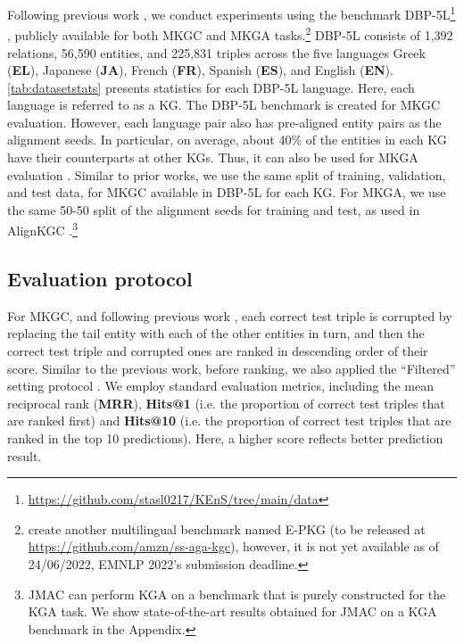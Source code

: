 \documentclass[11pt]{article}
\begin{document}
Following previous work \cite{singh2021multilingual,huang2022multilingual}, we conduct experiments using the benchmark DBP-5L\footnote{\url{https://github.com/stasl0217/KEnS/tree/main/data}} \cite{chen2020multilingual}, publicly available for both MKGC and MKGA tasks.\footnote{ create another multilingual benchmark named E-PKG (to be released at \url{https://github.com/amzn/ss-aga-kgc}), however, it is not yet available as of 24/06/2022, EMNLP 2022's submission deadline.}  DBP-5L consists of 1,392 relations, 56,590 entities, and 225,831 triples across the five languages Greek (\textbf{EL}), Japanese (\textbf{JA}), French (\textbf{FR}), Spanish (\textbf{ES}), and English (\textbf{EN}). \autoref{tab:datasetstats} presents statistics for each DBP-5L language.  Here, each language is referred to as a KG. The DBP-5L benchmark is created for MKGC evaluation. However, each language pair also has pre-aligned entity pairs as the alignment seeds. In particular, on average, about 40\% of the entities in each KG have their counterparts at other KGs. Thus, it can also be used for MKGA evaluation \cite{singh2021multilingual}.  
Similar to prior works, we use the same split of training, validation, and test data, for MKGC available in DBP-5L for each KG. For MKGA, we use the same 50-50 split of the alignment seeds for training and test, as used in  AlignKGC \cite{singh2021multilingual}.\footnote{JMAC can perform KGA on a benchmark that is purely constructed for the KGA task. We show state-of-the-art results obtained for JMAC on a KGA benchmark in the Appendix.}

\subsection{Evaluation protocol}

For MKGC, and following previous work \cite{chen2020multilingual, singh2021multilingual,huang2022multilingual}, each correct test triple  is corrupted by replacing the tail entity  with each of the other entities in turn, and then the correct test triple and corrupted ones are ranked in descending order of their score. Similar to the previous work, before ranking, we also applied the ``Filtered'' setting protocol \cite{bordes2013translating}. We employ standard evaluation metrics, including the mean reciprocal rank (\textbf{MRR}), \textbf{Hits@1} (i.e. the proportion of correct test triples that are ranked first) and \textbf{Hits@10} (i.e. the proportion of correct test triples that are ranked in the top 10 predictions). Here, a higher score reflects better prediction result. 
\end{document}
